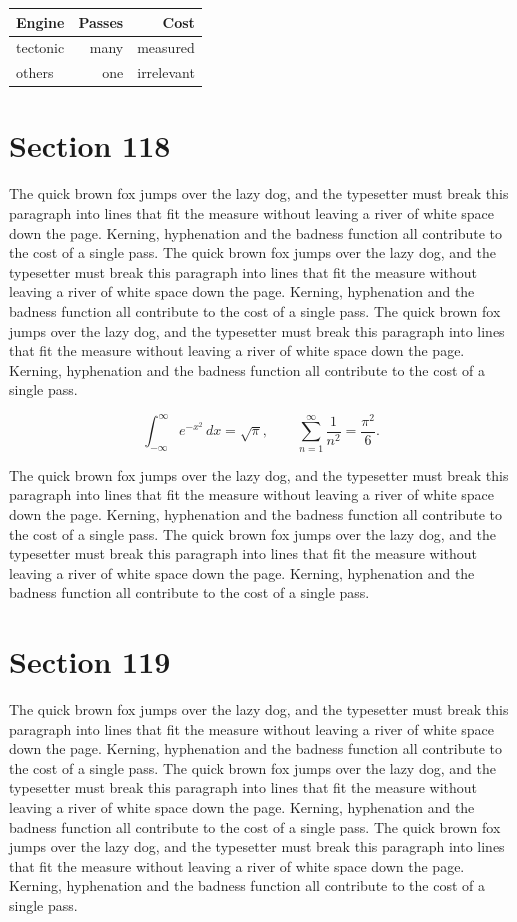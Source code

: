 \documentclass{article}
\begin{document}
\begin{center}
\begin{tabular}{lrr}
\toprule
Engine & Passes & Cost \\
\midrule
tectonic & many & measured \\
others & one & irrelevant \\
\bottomrule
\end{tabular}
\end{center}

\section{Section 118}
The quick brown fox jumps over the lazy dog, and the typesetter must break this paragraph into lines that fit the measure without leaving a river of white space down the page. Kerning, hyphenation and the badness function all contribute to the cost of a single pass. The quick brown fox jumps over the lazy dog, and the typesetter must break this paragraph into lines that fit the measure without leaving a river of white space down the page. Kerning, hyphenation and the badness function all contribute to the cost of a single pass. The quick brown fox jumps over the lazy dog, and the typesetter must break this paragraph into lines that fit the measure without leaving a river of white space down the page. Kerning, hyphenation and the badness function all contribute to the cost of a single pass. 

\begin{equation}
\int_{-\infty}^{\infty} e^{-x^{2}}\,dx = \sqrt{\pi}, \qquad
\sum_{n=1}^{\infty} \frac{1}{n^{2}} = \frac{\pi^{2}}{6}.
\end{equation}

The quick brown fox jumps over the lazy dog, and the typesetter must break this paragraph into lines that fit the measure without leaving a river of white space down the page. Kerning, hyphenation and the badness function all contribute to the cost of a single pass. The quick brown fox jumps over the lazy dog, and the typesetter must break this paragraph into lines that fit the measure without leaving a river of white space down the page. Kerning, hyphenation and the badness function all contribute to the cost of a single pass. 
\section{Section 119}
The quick brown fox jumps over the lazy dog, and the typesetter must break this paragraph into lines that fit the measure without leaving a river of white space down the page. Kerning, hyphenation and the badness function all contribute to the cost of a single pass. The quick brown fox jumps over the lazy dog, and the typesetter must break this paragraph into lines that fit the measure without leaving a river of white space down the page. Kerning, hyphenation and the badness function all contribute to the cost of a single pass. The quick brown fox jumps over the lazy dog, and the typesetter must break this paragraph into lines that fit the measure without leaving a river of white space down the page. Kerning, hyphenation and the badness function all contribute to the cost of a single pass. 
\end{document}
